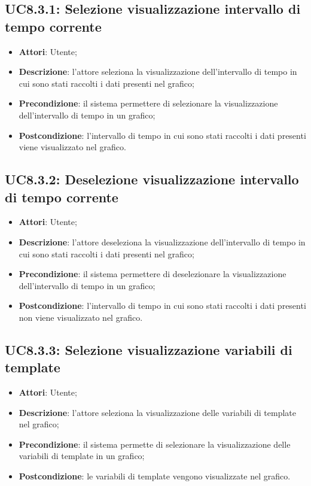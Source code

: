 \subsection{UC8.3.1: Selezione visualizzazione intervallo di tempo corrente}
\hypertarget{UC8.3.1}{}
\begin{itemize}
	\item \textbf{Attori}: Utente;
	\item \textbf{Descrizione}: l'attore seleziona la visualizzazione dell'intervallo di tempo in cui sono stati raccolti i dati presenti nel grafico;
	\item \textbf{Precondizione}: il sistema permettere di selezionare la visualizzazione dell'intervallo di tempo in un grafico;
	\item \textbf{Postcondizione}: l'intervallo di tempo in cui sono stati raccolti i dati presenti viene visualizzato nel grafico.
\end{itemize}

\subsection{UC8.3.2: Deselezione visualizzazione intervallo di tempo corrente}
\hypertarget{UC8.3.2}{}
\begin{itemize}
	\item \textbf{Attori}: Utente;
	\item \textbf{Descrizione}: l'attore deseleziona la visualizzazione dell'intervallo di tempo in cui sono stati raccolti i dati presenti nel grafico;
	\item \textbf{Precondizione}: il sistema permettere di deselezionare la visualizzazione dell'intervallo di tempo in un grafico;
	\item \textbf{Postcondizione}: l'intervallo di tempo in cui sono stati raccolti i dati presenti non viene visualizzato nel grafico.
\end{itemize}

\subsection{UC8.3.3: Selezione visualizzazione variabili di template}
\hypertarget{UC8.3.3}{}
\begin{itemize}
	\item \textbf{Attori}: Utente;
	\item \textbf{Descrizione}: l'attore seleziona la visualizzazione delle variabili di template nel grafico;
	\item \textbf{Precondizione}: il sistema permette di selezionare la visualizzazione delle variabili di template in un grafico;
	\item \textbf{Postcondizione}: le variabili di template vengono visualizzate nel grafico.
\end{itemize}

